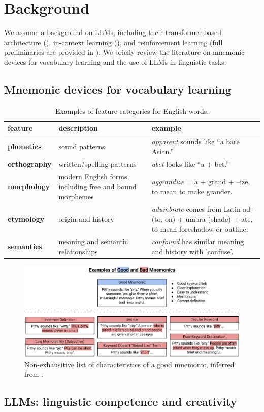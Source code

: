 
\section{Background} \label{sec:background}

We assume a background on LLMs, including their transformer-based architecture (), in-context learning (), and reinforcement learning (full preliminaries are provided in ). We briefly review the literature on mnemonic devices for vocabulary learning and the use of LLMs in linguistic tasks.

\subsection{Mnemonic devices for vocabulary learning} \label{sec:mnemonic-review}

\begin{table}[htb]
\centering
\caption{Examples of feature categories for English words.}
\label{tab:linguistic-features}
\begin{tabularx}{\textwidth}{l >{\raggedright\arraybackslash}X >{\raggedright\arraybackslash}X}
\toprule
\textbf{feature} & \textbf{description} & \textbf{example} \\
\midrule
\textbf{phonetics} & sound patterns & \emph{apparent} sounds like “a bare Asian.” \\
\addlinespace
\textbf{orthography} & written/spelling patterns & \emph{abet} looks like “a + bet.” \\
\addlinespace
\textbf{morphology} & modern English forms, including free and bound morphemes & \emph{aggrandize} = a + grand + –ize, to mean to make grander. \\
\addlinespace
\textbf{etymology} & origin and history & \emph{adumbrate} comes from Latin ad- (to, on) + umbra (shade) + ate, to mean foreshadow or outline. \\
\addlinespace
\textbf{semantics} & meaning and semantic relationships & \emph{confound} has similar meaning and history with 'confuse'. \\
\bottomrule
\end{tabularx}
\end{table}

\begin{figure}
  \includegraphics[width=\linewidth]{figures/good_bad_mnemonics.pdf}
  \caption{Non-exhausitive list of characteristics of a good mnemonic, inferred from \citetext{\citealp{BalepurSMART2024}, \citealp{CamposUSING2011}, \citealp{SariogluUSE2024}}.}
  \label{fig:good-mnemonic}
\end{figure}
\subsection{LLMs: linguistic competence and creativity} \label{sec:llm-linguistic-competence}
